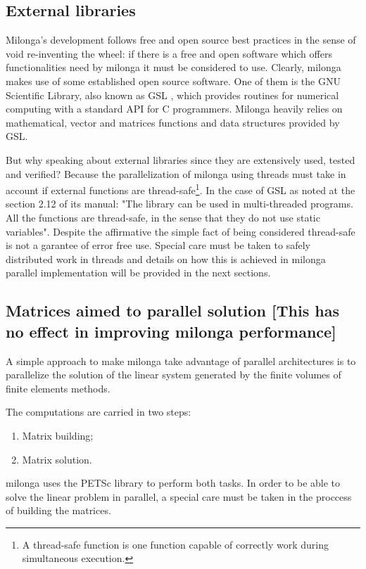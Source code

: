 \documentclass{anstrans}
\begin{document}
\subsection{External libraries}

Milonga's development follows free and open source best practices in the sense of void re-inventing the wheel:
if there is a free and open software which offers functionalities need by milonga it must be considered to use.
Clearly, milonga makes use of some established open source software. One of them is the GNU Scientific Library, also
known as GSL \cite{gsl2016}, which provides routines for numerical computing with a standard API for C
programmers. Milonga heavily relies on mathematical, vector and matrices functions and data structures provided
by GSL.

But why speaking about external libraries since they are extensively used, tested and verified? Because
the parallelization of milonga using threads must take in account if external functions are
thread-safe\footnote{A thread-safe function is one function capable of correctly work during simultaneous
  execution.}. In the case of GSL as noted at the section 2.12 of its manual: "The library can be used in multi-threaded programs. All the functions are thread-safe, in the sense that they do not use static variables". Despite the affirmative the
simple fact of being considered thread-safe is not a garantee of error free use. Special care must be taken to safely
distributed work in threads and details on how this is achieved in milonga parallel implementation will be provided
in the next sections.

\subsection{Matrices aimed to parallel solution [This has no effect in improving milonga performance]}
A simple approach to make milonga take advantage of parallel architectures is to parallelize the
solution of the linear system generated by the finite volumes of finite elements methods.

The computations are carried in two steps:
\begin{enumerate}
\item Matrix building;
  \item Matrix solution.
\end{enumerate}

milonga uses the PETSc library to perform both tasks. In order to be able to solve the linear problem
in parallel, a special care must be taken in the proccess of building the matrices.
\end{document}
